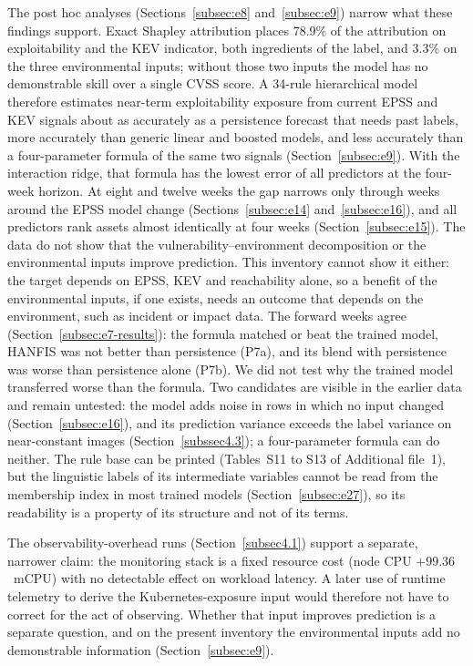 \documentclass[referee,lineno,pdflatex,sn-basic]{sn-jnl}%
\theoremstyle{thmstyleone}%
\theoremstyle{thmstyletwo}%
\theoremstyle{thmstylethree}%
\begin{document}
The post hoc analyses (Sections~\ref{subsec:e8} and~\ref{subsec:e9}) narrow what these findings support. Exact Shapley attribution places 78.9\% of the attribution on exploitability and the KEV indicator, both ingredients of the label, and 3.3\% on the three environmental inputs; without those two inputs the model has no demonstrable skill over a single CVSS score. A 34-rule hierarchical model therefore estimates near-term exploitability exposure from current EPSS and KEV signals about as accurately as a persistence forecast that needs past labels, more accurately than generic linear and boosted models, and less accurately than a four-parameter formula of the same two signals (Section~\ref{subsec:e9}). With the interaction ridge, that formula has the lowest error of all predictors at the four-week horizon. At eight and twelve weeks the gap narrows only through weeks around the EPSS model change (Sections~\ref{subsec:e14} and~\ref{subsec:e16}), and all predictors rank assets almost identically at four weeks (Section~\ref{subsec:e15}). The data do not show that the vulnerability--environment decomposition or the environmental inputs improve prediction. This inventory cannot show it either: the target depends on EPSS, KEV and reachability alone, so a benefit of the environmental inputs, if one exists, needs an outcome that depends on the environment, such as incident or impact data. The forward weeks agree (Section~\ref{subsec:e7-results}): the formula matched or beat the trained model, HANFIS was not better than persistence (P7a), and its blend with persistence was worse than persistence alone (P7b). We did not test why the trained model transferred worse than the formula. Two candidates are visible in the earlier data and remain untested: the model adds noise in rows in which no input changed (Section~\ref{subsec:e16}), and its prediction variance exceeds the label variance on near-constant images (Section~\ref{subssec4.3}); a four-parameter formula can do neither. The rule base can be printed (Tables~S11 to S13 of Additional file~1), but the linguistic labels of its intermediate variables cannot be read from the membership index in most trained models (Section~\ref{subsec:e27}), so its readability is a property of its structure and not of its terms.

The observability-overhead runs (Section~\ref{subsec4.1}) support a separate, narrower claim: the monitoring stack is a fixed resource cost (node CPU $+99.36$~mCPU) with no detectable effect on workload latency. A later use of runtime telemetry to derive the Kubernetes-exposure input would therefore not have to correct for the act of observing. Whether that input improves prediction is a separate question, and on the present inventory the environmental inputs add no demonstrable information (Section~\ref{subsec:e9}).
\end{document}
